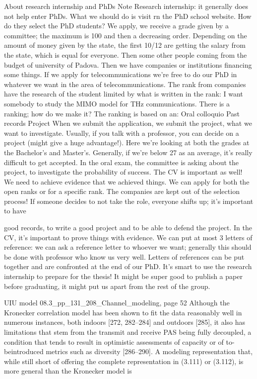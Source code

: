 {{{{About research internship and PhDs Note Research internship: it generally does not help enter PhDs.
What we should do is visit rn the PhD school website. How do they select the PhD students?
We apply, we receive a grade given by a committee; the maximum is 100 and then a decreasing order. Depending on the amount of money given by the state, the first 10/12 are getting the salary from the state, which is equal for everyone. Then some other people coming from the budget of university of Padova. Then we have companies or institutions financing some things.
If we apply for telecommunications we're free to do our PhD in whatever we want in the area of telecommunications.
The rank from companies have the research of the student limited by what is written in the rank: I want somebody to study the MIMO model for THz communications.
There is a ranking; how do we make it? The ranking is based on an:
Oral colloquio Past records Project When we submit the application, we submit the project, what we want to investigate.
Usually, if you talk with a professor, you can decide on a project (might give a huge advantage!). Here we're looking at both the grades at the Bachelor's and Master's.
Generally, if we're below 27 as an average, it's really difficult to get accepted.
In the oral exam, the committee is asking about the project, to investigate the probability of success.
The CV is important as well! We need to achieve evidence that we achieved things.
We can apply for both the open ranks or for a specific rank.
The companies are kept out of the selection process!
If someone decides to not take the role, everyone shifts up; it's important to have

good records, to write a good project and to be able to defend the project. In the CV, it's important to prove things with evidence.
We can put at most 3 letters of reference: we can ask a reference letter to whoever we want; generally this should be done with professor who know us very well.
Letters of references can be put together and are confronted at the end of our PhD.
It's smart to use the research internship to prepare for the thesis! It might be super good to publish a paper before graduating, it might put us apart from the rest of the group.

UIU model 08.3_pp_131_208_Channel_modeling, page 52 Although the Kronecker correlation model has been shown to fit the data reasonably well in numerous instances, both indoors [272, 282–284] and outdoors [285], it also has limitations that stem from the transmit and receive PAS being fully decoupled, a condition that tends to result in optimistic assessments of capacity or of to-beintroduced metrics such as diversity [286–290]. A modeling representation that,
while still short of offering the complete representation in (3.111) or (3.112), is more general than the Kronecker model is

}}}}
